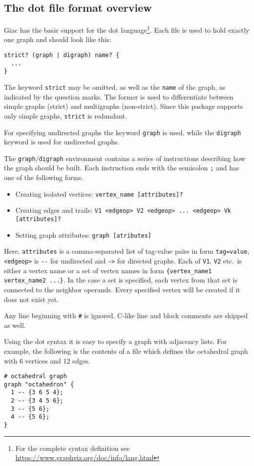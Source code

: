 \documentclass[a4paper,11pt]{article}
\begin{document}
\subsection{The {\sf dot} file format overview}\label{sec:dotformat}

Giac has the basic support for the {\sf dot} language\footnote{For the complete syntax definition see \url{https://www.graphviz.org/doc/info/lang.html}}. Each file is used to hold exactly one graph and should look like this:
\begin{verbatim}
strict? (graph | digraph) name? {
  ...
}
\end{verbatim}
The keyword {\tt strict} may be omitted, as well as the {\tt name} of the graph, as indicated by the question marks. The former is used to differentiate between simple graphs (strict) and multigraphs (non-strict). Since this package supports only simple graphs, {\tt strict} is redundant.

For specifying undirected graphs the keyword {\tt graph} is used, while the {\tt digraph} keyword is used for undirected graphs.

The {\tt graph}/{\tt digraph} environment contains a series of instructions describing how the graph should be built. Each instruction ends with the semicolon {\tt ;} and has one of the following forms.
\begin{itemize}
  \item Creating isolated vertices: {\tt vertex\_name [attributes]?}
  \item Creating edges and trails: {\tt V1 <edgeop> V2 <edgeop> ... <edgeop> Vk [attributes]?}
  \item Setting graph attributes: {\tt graph [atributes]}
\end{itemize}

Here, {\tt attributes} is a comma-separated list of tag-value pairs in form {\tt tag=value}, {\tt <edgeop>} is \verb|--| for undirected and {\tt ->} for directed graphs. Each of {\tt V1}, {\tt V2} etc.~is either a vertex name or a set of vertex names in form {\tt \{vertex\_name1 vertex\_name2 ...\}}. In the case a set is specified, each vertex from that set is connected to the neighbor operands. Every specified vertex will be created if it does not exist yet.

Any line beginning with {\tt \#} is ignored. C-like line and block comments are skipped as well.

Using the {\sf dot} syntax it is easy to specify a graph with adjacency lists. For example, the following is the contents of a file which defines the octahedral graph with 6 vertices and 12 edges.
\begin{verbatim}
# octahedral graph
graph "octahedron" {
  1 -- {3 6 5 4};
  2 -- {3 4 5 6};
  3 -- {5 6};
  4 -- {5 6};
}
\end{verbatim}
\end{document}
